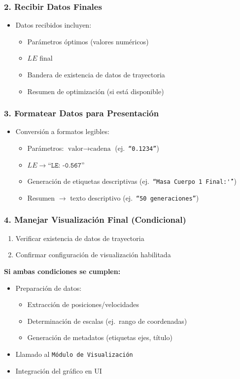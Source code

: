 \subsubsection*{2. Recibir Datos Finales}
\begin{itemize}
    \item Datos recibidos incluyen:
    \begin{itemize}
        \item Parámetros óptimos (valores numéricos)
        \item $LE$ final
        \item Bandera de existencia de datos de trayectoria
        \item Resumen de optimización (si está disponible)
    \end{itemize}
\end{itemize}

\subsubsection*{3. Formatear Datos para Presentación}
\begin{itemize}
    \item Conversión a formatos legibles:
    \begin{itemize}
        \item Parámetros: $\text{valor} \to \text{cadena}$ (ej.\ \texttt{``0.1234''})
        \item $LE \to \texttt{``LE: -0.567''}$
        \item Generación de etiquetas descriptivas (ej.\ \texttt{``Masa Cuerpo 1 Final:\~''})
        \item Resumen $\to$ texto descriptivo (ej.\ \texttt{``50 generaciones''})
    \end{itemize}
\end{itemize}

\subsubsection*{4. Manejar Visualización Final (Condicional)}
\begin{enumerate}[label=Condición \arabic*:]
    \item Verificar existencia de datos de trayectoria
    \item Confirmar configuración de visualización habilitada
\end{enumerate}

\textbf{Si ambas condiciones se cumplen:}
\begin{itemize}
    \item Preparación de datos:
    \begin{itemize}
        \item Extracción de posiciones/velocidades
        \item Determinación de escalas (ej.\ rango de coordenadas)
        \item Generación de metadatos (etiquetas ejes, título)
    \end{itemize}
    \item Llamado al \texttt{Módulo de Visualización}
    \item Integración del gráfico en UI
\end{itemize}

